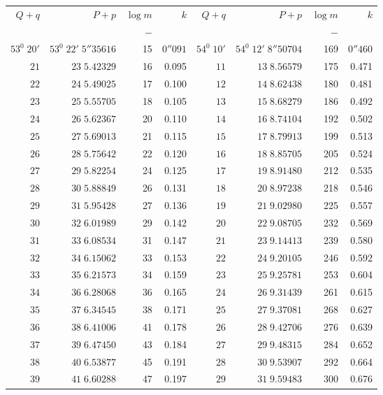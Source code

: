 \clearpage
{}
\begingroup
\fontsize{8}{9}\selectfont
\setlength{\tabcolsep}{3pt}
\renewcommand{\arraystretch}{1.08}
\begin{center}
\begin{tabular}{|r|r|r|r||r|r|r|r|}
\hline
\(Q+q\)&\(P+p\)&\(\log m\)&\(k\)&\(Q+q\)&\(P+p\)&\(\log m\)&\(k\)\\
&&\(-\)&&&&\(-\)&\\\hline
\(53^0\;20'\)&\(53^0\;22'\;5''35616\)&15&\(0''091\)&\(54^0\;10'\)&\(54^0\;12'\;8''50704\)&169&\(0''460\)\\
\(21\)&\(23\;5.42329\)&16&0.095&\(11\)&\(13\;8.56579\)&175&0.471\\
\(22\)&\(24\;5.49025\)&17&0.100&\(12\)&\(14\;8.62438\)&180&0.481\\
\(23\)&\(25\;5.55705\)&18&0.105&\(13\)&\(15\;8.68279\)&186&0.492\\
\(24\)&\(26\;5.62367\)&20&0.110&\(14\)&\(16\;8.74104\)&192&0.502\\
\(25\)&\(27\;5.69013\)&21&0.115&\(15\)&\(17\;8.79913\)&199&0.513\\
\(26\)&\(28\;5.75642\)&22&0.120&\(16\)&\(18\;8.85705\)&205&0.524\\
\(27\)&\(29\;5.82254\)&24&0.125&\(17\)&\(19\;8.91480\)&212&0.535\\
\(28\)&\(30\;5.88849\)&26&0.131&\(18\)&\(20\;8.97238\)&218&0.546\\
\(29\)&\(31\;5.95428\)&27&0.136&\(19\)&\(21\;9.02980\)&225&0.557\\[3pt]
\(30\)&\(32\;6.01989\)&29&0.142&\(20\)&\(22\;9.08705\)&232&0.569\\
\(31\)&\(33\;6.08534\)&31&0.147&\(21\)&\(23\;9.14413\)&239&0.580\\
\(32\)&\(34\;6.15062\)&33&0.153&\(22\)&\(24\;9.20105\)&246&0.592\\
\(33\)&\(35\;6.21573\)&34&0.159&\(23\)&\(25\;9.25781\)&253&0.604\\
\(34\)&\(36\;6.28068\)&36&0.165&\(24\)&\(26\;9.31439\)&261&0.615\\
\(35\)&\(37\;6.34545\)&38&0.171&\(25\)&\(27\;9.37081\)&268&0.627\\
\(36\)&\(38\;6.41006\)&41&0.178&\(26\)&\(28\;9.42706\)&276&0.639\\
\(37\)&\(39\;6.47450\)&43&0.184&\(27\)&\(29\;9.48315\)&284&0.652\\
\(38\)&\(40\;6.53877\)&45&0.191&\(28\)&\(30\;9.53907\)&292&0.664\\
\(39\)&\(41\;6.60288\)&47&0.197&\(29\)&\(31\;9.59483\)&300&0.676\\[3pt]

\end{tabular}
\end{center}
